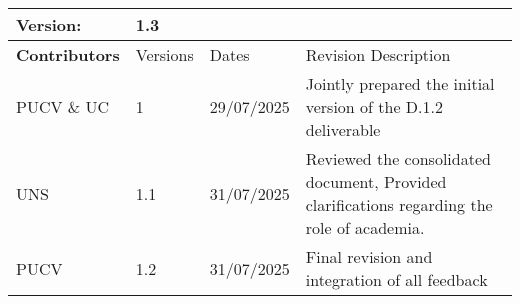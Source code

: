 \begin{tabular}{ >{\raggedright\arraybackslash}p{3cm}| p{2cm} p{4cm} p{6cm} }
    \toprule
    \textbf{Version}: & \multicolumn{3}{l}{ 1.3} \\ \midrule
    \textbf{Contributors}  & Versions    & Dates       & Revision Description \\ \midrule
    PUCV \& UC  & 1    & 29/07/2025  & Jointly prepared the initial version of the D.1.2 deliverable  \\ 
    UNS  & 1.1    & 31/07/2025  & Reviewed the consolidated document, Provided clarifications regarding the role of academia.  \\ 
    PUCV  & 1.2   & 31/07/2025  & Final revision and integration of all feedback  \\ 
    \bottomrule
\end{tabular}  
